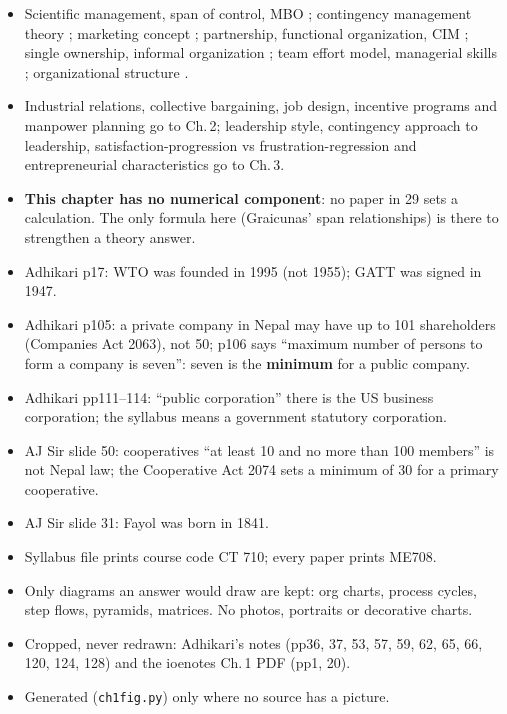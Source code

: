 \begin{itemize}
  \item Scientific management, span of control, MBO ; contingency management
    theory ; marketing concept ; partnership, functional organization,
    CIM ; single ownership, informal organization ; team effort model,
    managerial skills ; organizational structure .
  \item Industrial relations, collective bargaining, job design, incentive programs and
    manpower planning go to Ch.\,2; leadership style, contingency approach to leadership,
    satisfaction-progression vs frustration-regression and entrepreneurial characteristics
    go to Ch.\,3.
\end{itemize}

\begin{itemize}
  \item \textbf{This chapter has no numerical component}: no paper in 29 sets a calculation.
    The only formula here (Graicunas' span relationships) is there to strengthen a theory
    answer.
\end{itemize}

\begin{itemize}
  \item Adhikari p17: WTO was founded in 1995 (not 1955); GATT was signed in 1947.
  \item Adhikari p105: a private company in Nepal may have up to 101 shareholders (Companies
    Act 2063), not 50; p106 says ``maximum number of persons to form a company is seven'':
    seven is the \textbf{minimum} for a public company.
  \item Adhikari pp111--114: ``public corporation'' there is the US business corporation;
    the syllabus means a government statutory corporation.
  \item AJ Sir slide 50: cooperatives ``at least 10 and no more than 100 members'' is not
    Nepal law; the Cooperative Act 2074 sets a minimum of 30 for a primary cooperative.
  \item AJ Sir slide 31: Fayol was born in 1841.
  \item Syllabus file prints course code CT 710; every paper prints ME708.
\end{itemize}

\begin{itemize}
  \item Only diagrams an answer would draw are kept: org charts, process cycles, step
    flows, pyramids, matrices. No photos, portraits or decorative charts.
  \item Cropped, never redrawn: Adhikari's notes (pp36, 37, 53, 57, 59, 62, 65, 66, 120,
    124, 128) and the ioenotes Ch.\,1 PDF (pp1, 20).
  \item Generated (\texttt{ch1fig.py}) only where no source has a picture.
\end{itemize}
